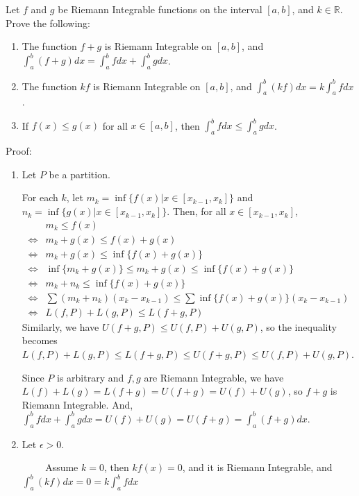 \documentclass{article}
\begin{document}
Let $f$ and $g$ be Riemann Integrable functions on the interval $[a,b]$, and $k\in\mathbb{R}$.  Prove the following:
\begin{enumerate}
\item The function $f+g$ is Riemann Integrable on $[a,b]$, and $\int_a^b(f+g)dx=\int_a^bfdx+\int_a^bgdx$.
\item The function $kf$ is Riemann Integrable on $[a,b]$, and $\int_a^b(kf)dx=k\int_a^bfdx$.
\item If $f(x)\leq g(x)$ for all $x\in[a,b]$, then $\int_a^bfdx\leq\int_a^bgdx$.
\end{enumerate}

Proof:

\begin{enumerate}
    \item Let $P$ be a partition. 

    For each $k$, let $m_k = \inf\{f(x) | x \in [x_{k-1}, x_k]\}$ and $n_k= \inf\{g(x) | x \in [x_{k-1}, x_k]\}$. Then, for all $x \in [x_{k-1}, x_k]$, 
\begin{align*}    
		 &m_k \le f(x)\\
		 \Leftrightarrow &m_k + g(x) \le f(x) + g(x)\\
		 \Leftrightarrow & m_k + g(x) \le \inf\{f(x) +g(x)\}\\
		 \Leftrightarrow &\inf\{m_k + g(x)\} \le m_k + g(x) \le \inf\{f(x) +g(x)\}\\
		 \Leftrightarrow &m_k + n_k \le \inf\{f(x) +g(x)\}\\
		 \Leftrightarrow &\sum (m_k + n_k)(x_{k}-x_{k-1}) \le \sum\inf\{f(x) +g(x)\}(x_k - x_{k-1})\\
		 \Leftrightarrow &L(f, P) + L(g, P) \le L(f+g, P)
\end{align*}
    Similarly, we have $U(f+g, P) \le U(f,P) + U(g,P)$, so the inequality becomes $L(f, P) + L(g, P) \le L(f+g, P) \le U(f+g, P) \le U(f,P) + U(g,P)$. 
    
    Since $P$ is arbitrary and $f, g$ are Riemann Integrable, we have \\$L(f) + L(g) = L(f+g) = U(f+g) = U(f) + U(g)$, so $f+g$ is Riemann Integrable. And, $\int_a^bfdx+\int_a^bgdx = U(f) + U(g) = U(f+g) = \int_a^b(f+g)dx$. 

    \item Let $\epsilon > 0$.
    
    $\hspace{1cm}$Assume $k = 0$, then $kf(x) = 0$, and it is Riemann Integrable, and $\int_a^b(kf)dx=0  = k\int_a^bfdx$
    

\end{enumerate}
\end{document}
